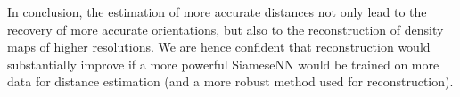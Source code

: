 In conclusion, the estimation of more accurate distances not only lead to the recovery of more accurate orientations, but also to the reconstruction of density maps of higher resolutions.
We are hence confident that reconstruction would substantially improve if a more powerful SiameseNN would be trained on more data for distance estimation (and a more robust method used for reconstruction).
